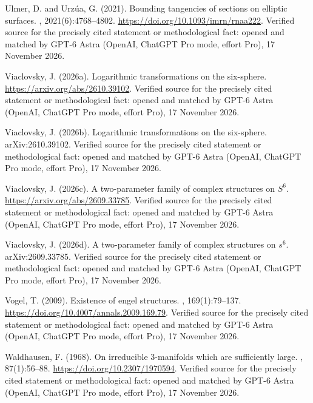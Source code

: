 \begin{thebibliography}{}
Ulmer, D. and Urz\'ua, G. (2021).
\newblock Bounding tangencies of sections on elliptic surfaces.
, 2021(6):4768--4802.
\newblock \url{https://doi.org/10.1093/imrn/rnaa222}. Verified source for the precisely cited statement or methodological fact: opened and matched by GPT-6 Astra (OpenAI, ChatGPT Pro mode, effort Pro), 17 November 2026.

Viaclovsky, J. (2026a).
\newblock Logarithmic transformations on the six-sphere.
\newblock \url{https://arxiv.org/abs/2610.39102}. Verified source for the precisely cited statement or methodological fact: opened and matched by GPT-6 Astra (OpenAI, ChatGPT Pro mode, effort Pro), 17 November 2026.

Viaclovsky, J. (2026b).
\newblock Logarithmic transformations on the six-sphere.
\newblock arXiv:2610.39102. Verified source for the precisely cited statement or methodological fact: opened and matched by GPT-6 Astra (OpenAI, ChatGPT Pro mode, effort Pro), 17 November 2026.

Viaclovsky, J. (2026c).
\newblock A two-parameter family of complex structures on {$S^6$}.
\newblock \url{https://arxiv.org/abs/2609.33785}. Verified source for the precisely cited statement or methodological fact: opened and matched by GPT-6 Astra (OpenAI, ChatGPT Pro mode, effort Pro), 17 November 2026.

Viaclovsky, J. (2026d).
\newblock A two-parameter family of complex structures on $s^6$.
\newblock arXiv:2609.33785. Verified source for the precisely cited statement or methodological fact: opened and matched by GPT-6 Astra (OpenAI, ChatGPT Pro mode, effort Pro), 17 November 2026.

Vogel, T. (2009).
\newblock Existence of engel structures.
, 169(1):79--137.
\newblock \url{https://doi.org/10.4007/annals.2009.169.79}. Verified source for the precisely cited statement or methodological fact: opened and matched by GPT-6 Astra (OpenAI, ChatGPT Pro mode, effort Pro), 17 November 2026.

Waldhausen, F. (1968).
\newblock On irreducible $3$-manifolds which are sufficiently large.
, 87(1):56--88.
\newblock \url{https://doi.org/10.2307/1970594}. Verified source for the precisely cited statement or methodological fact: opened and matched by GPT-6 Astra (OpenAI, ChatGPT Pro mode, effort Pro), 17 November 2026.


\end{thebibliography}
